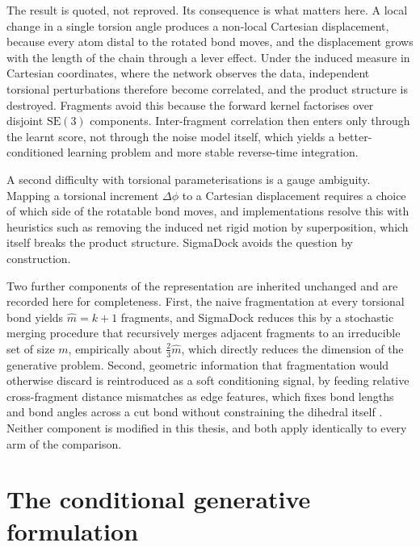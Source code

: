 \documentclass[11pt,a4paper]{report}
\theoremstyle{plain}
\theoremstyle{definition}
\theoremstyle{remark}
\newcommand{\SEthree}{\mathrm{SE}(3)}
\begin{document}
\noindent
The result is quoted, not reproved. Its consequence is what matters here. A
local change in a single torsion angle produces a non-local Cartesian
displacement, because every atom distal to the rotated bond moves, and the
displacement grows with the length of the chain through a lever effect. Under
the induced measure in Cartesian coordinates, where the network observes the
data, independent torsional perturbations therefore become correlated, and the
product structure is destroyed. Fragments avoid this because the forward
kernel factorises over disjoint $\SEthree$ components. Inter-fragment
correlation then enters only through the learnt score, not through the noise
model itself, which yields a better-conditioned learning problem and more
stable reverse-time integration.

A second difficulty with torsional parameterisations is a gauge ambiguity.
Mapping a torsional increment $\Delta\phi$ to a Cartesian displacement
requires a choice of which side of the rotatable bond moves, and
implementations resolve this with heuristics such as removing the induced net
rigid motion by superposition, which itself breaks the product structure.
SigmaDock avoids the question by construction.

Two further components of the representation are inherited unchanged and are
recorded here for completeness. First, the naive fragmentation at every
torsional bond yields $\hat{m} = k+1$ fragments, and SigmaDock reduces this by
a stochastic merging procedure that recursively merges adjacent fragments to
an irreducible set of size $m$, empirically about $\tfrac{2}{3}\hat{m}$, which
directly reduces the dimension of the generative problem. Second, geometric
information that fragmentation would otherwise discard is reintroduced as a
soft conditioning signal, by feeding relative cross-fragment distance
mismatches as edge features, which fixes bond lengths and bond angles across a
cut bond without constraining the dihedral itself
\citep[Lemma~1]{prat2026sigmadock}. Neither component is modified in this
thesis, and both apply identically to every arm of the comparison.

\section{The conditional generative formulation}
\label{sec:conditional}
\end{document}
